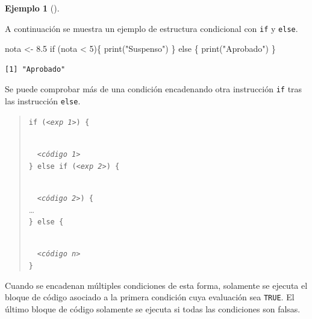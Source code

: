 \documentclass[
  a4paper,
]{scrreport}
\newenvironment{Shaded}{\begin{snugshade}}{\end{snugshade}}
\newcommand{\ControlFlowTok}[1]{\textcolor[rgb]{0.00,0.23,0.31}{#1}}
\newcommand{\DecValTok}[1]{\textcolor[rgb]{0.68,0.00,0.00}{#1}}
\newcommand{\FloatTok}[1]{\textcolor[rgb]{0.68,0.00,0.00}{#1}}
\newcommand{\FunctionTok}[1]{\textcolor[rgb]{0.28,0.35,0.67}{#1}}
\newcommand{\NormalTok}[1]{\textcolor[rgb]{0.00,0.23,0.31}{#1}}
\newcommand{\OtherTok}[1]{\textcolor[rgb]{0.00,0.23,0.31}{#1}}
\newcommand{\SpecialCharTok}[1]{\textcolor[rgb]{0.37,0.37,0.37}{#1}}
\newcommand{\StringTok}[1]{\textcolor[rgb]{0.13,0.47,0.30}{#1}}
\theoremstyle{definition}
\theoremstyle{definition}
\newtheorem{example}{Ejemplo}[chapter]
\theoremstyle{remark}
\begin{document}
\leavevmode{}%
\begin{example}[]\label{exm-condicional-doble}

A continuación se muestra un ejemplo de estructura condicional con
\texttt{if} y \texttt{else}.

\begin{Shaded}
\begin{Highlighting}[]
\NormalTok{nota }\OtherTok{\textless{}{-}} \FloatTok{8.5}
\ControlFlowTok{if}\NormalTok{ (nota }\SpecialCharTok{\textless{}} \DecValTok{5}\NormalTok{)\{}
  \FunctionTok{print}\NormalTok{(}\StringTok{"Suspenso"}\NormalTok{)}
\NormalTok{\} }\ControlFlowTok{else}\NormalTok{ \{}
  \FunctionTok{print}\NormalTok{(}\StringTok{"Aprobado"}\NormalTok{)}
\NormalTok{\}}
\end{Highlighting}
\end{Shaded}

\begin{verbatim}
[1] "Aprobado"
\end{verbatim}

\end{example}

Se puede comprobar más de una condición encadenando otra instrucción
\texttt{if} tras las instrucción \texttt{else}.

\begin{quote}
\texttt{if\ (}\emph{\texttt{\textless{}exp\ 1\textgreater{}}}\texttt{)\ \{}\strut \\
  \emph{\texttt{\textless{}código\ 1\textgreater{}}}\\
\texttt{\}\ else\ if\ (}\emph{\texttt{\textless{}exp\ 2\textgreater{}}}\texttt{)\ \{}\strut \\
  \emph{\texttt{\textless{}código\ 2\textgreater{}}}\texttt{)\ \{}\\
\ldots{}\\
\texttt{\}\ else\ \{}\strut \\
  \emph{\texttt{\textless{}código\ n\textgreater{}}}\\
\texttt{\}}
\end{quote}

Cuando se encadenan múltiples condiciones de esta forma, solamente se
ejecuta el bloque de código asociado a la primera condición cuya
evaluación sea \texttt{TRUE}. El último bloque de código solamente se
ejecuta si todas las condiciones son falsas.
\end{document}
